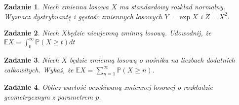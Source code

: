 \documentclass{mwart}
\newtheorem{zd}{Zadanie}
\begin{document}
\begin{zd}
Niech zmienna losowa $X$ ma standardowy rozkład normalny. Wyznacz dystrybuantę i gęstośc zmiennych losowych $Y=\exp{X}$ i $Z=X^2$.
\end{zd}

\begin{zd}
Niech $X$będzie nieujemną zminną losową. Udowodnij, że $\mathbb{E}X = \int_{0}^{\infty}\mathbb{P}\left(X \geq t\right)dt$
\end{zd}

\begin{zd}
Niech $X$ będzie zmienną losową o nośniku na liczbach dodatnich całkowitych. Wykaż, że $\mathbb{E}X = \sum_{n=1}^{\infty}\mathbb{P}\left(X \geq n\right)$.
\end{zd}

\begin{zd}
Oblicz wartość oczekiwaną zmiennej losowej o rozkładzie geometrycznym z parametrem $p$.
\end{zd}
\end{document}
